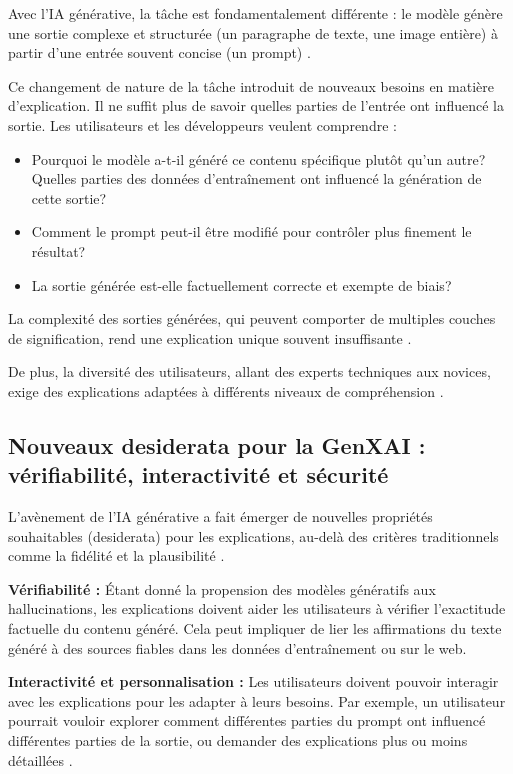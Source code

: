 Avec l'IA générative, la tâche est fondamentalement différente : le modèle génère une sortie complexe et structurée (un paragraphe de texte, une image entière) à partir d'une entrée souvent concise (un prompt) \citet{White2023}.

Ce changement de nature de la tâche introduit de nouveaux besoins en matière d'explication. Il ne suffit plus de savoir quelles parties de l'entrée ont influencé la sortie. Les utilisateurs et les développeurs veulent comprendre :
\begin{itemize}[label=\textbullet]
    \item Pourquoi le modèle a-t-il généré ce contenu spécifique plutôt qu'un autre?
    \tem Quelles parties des données d'entraînement ont influencé la génération de cette sortie?
    \item Comment le prompt peut-il être modifié pour contrôler plus finement le résultat?
    \item La sortie générée est-elle factuellement correcte et exempte de biais?
\end{itemize}

La complexité des sorties générées, qui peuvent comporter de multiples couches de signification, rend une explication unique souvent insuffisante \citet{Schneider2024b}.

De plus, la diversité des utilisateurs, allant des experts techniques aux novices, exige des explications adaptées à différents niveaux de compréhension \citet{Meske2022}.
\subsection{Nouveaux desiderata pour la GenXAI : vérifiabilité, interactivité et sécurité}
L'avènement de l'IA générative a fait émerger de nouvelles propriétés souhaitables (desiderata) pour les explications, au-delà des critères traditionnels comme la fidélité et la plausibilité \citet{Schneider2024b}.

\textbf{Vérifiabilité :} Étant donné la propension des modèles génératifs aux hallucinations, les explications doivent aider les utilisateurs à vérifier l'exactitude factuelle du contenu généré. Cela peut impliquer de lier les affirmations du texte généré à des sources fiables dans les données d'entraînement ou sur le web.

\textbf{Interactivité et personnalisation :} Les utilisateurs doivent pouvoir interagir avec les explications pour les adapter à leurs besoins. Par exemple, un utilisateur pourrait vouloir explorer comment différentes parties du prompt ont influencé différentes parties de la sortie, ou demander des explications plus ou moins détaillées \citep{Schwalbe2023, Schneider2019}.

